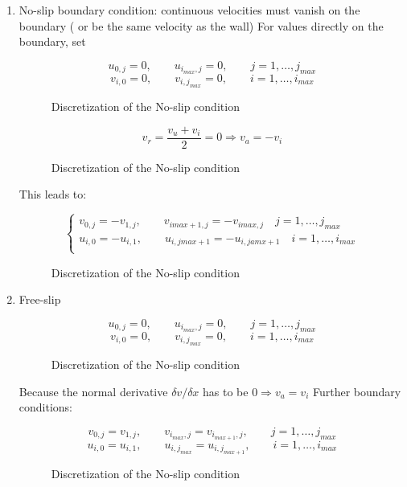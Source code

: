 \begin{enumerate}
	\item No-slip boundary condition: continuous velocities must vanish on the boundary ( or be the same velocity as the wall)
For values directly on the boundary, set
\begin{figure}[H]
	\centering
	\[ u_{0,j} = 0, \qquad u_{i_{max},j} = 0, \qquad j = 1,\dots,j_{max} \]
	\[ v_{i,0} = 0, \qquad v_{i,j_{max}} = 0, \qquad i = 1,\dots,i_{max} \]
	\renewcommand{\thefigure}{3.21}
	\caption{Discretization of the No-slip condition}
	\label{fig:disc-nosplipa}
\end{figure}

\begin{figure}[H]
	\centering
	\[ v_r = \frac{v_u + v_i}{2} = 0 \Rightarrow v_a = -v_i\]
	\renewcommand{\thefigure}{3.22}
	\caption{Discretization of the No-slip condition}
	\label{fig:disc-nosplipb}
\end{figure}

This leads to: %
\begin{figure}[H]
	\centering
   \[\begin{cases}
         v_{0,j} = -v_{1,j}, \qquad v_{imax+1,j} = -v_{imax,j} \quad j = 1,\dots, j_{max} \\
         u_{i,0} = -u_{i,1}, \qquad u_{i,jmax+1} = -u_{i,jamx+1} \quad i = 1,\dots, i_{max}\\
      \end{cases}
   \]
	\renewcommand{\thefigure}{3.23}
	\caption{Discretization of the No-slip condition}
	\label{fig:disc-nosplipc}
\end{figure}

	\item Free-slip
\begin{figure}[H]
	\centering
	\[ u_{0,j} = 0, \qquad u_{i_{max},j} = 0, \qquad j = 1,\dots,j_{max} \]
	\[ v_{i,0} = 0, \qquad v_{i,j_{max}} = 0, \qquad i = 1,\dots,i_{max} \]
	\renewcommand{\thefigure}{3.24}
	\caption{Discretization of the No-slip condition}
	\label{fig:disc-freesplipa}
\end{figure}

Because the normal derivative $\delta v/ \delta x$ has to be $0 \Rightarrow v_a = v_i$ Further boundary conditions:
\begin{figure}[H]
	\centering
	\[ v_{0,j} = v_{1,j}, \qquad v_{i_{max},j} = v_{i_{max+1}, j}, \qquad j = 1,\dots,j_{max} \]
	\[ u_{i,0} = u_{i,1}, \qquad u_{i,j_{max}} = u_{i,j_{max+1}}, \qquad i = 1,\dots,i_{max} \]
	\renewcommand{\thefigure}{3.25}
	\caption{Discretization of the No-slip condition}
	\label{fig:disc-freesplipb}
\end{figure}
	

\end{enumerate}
